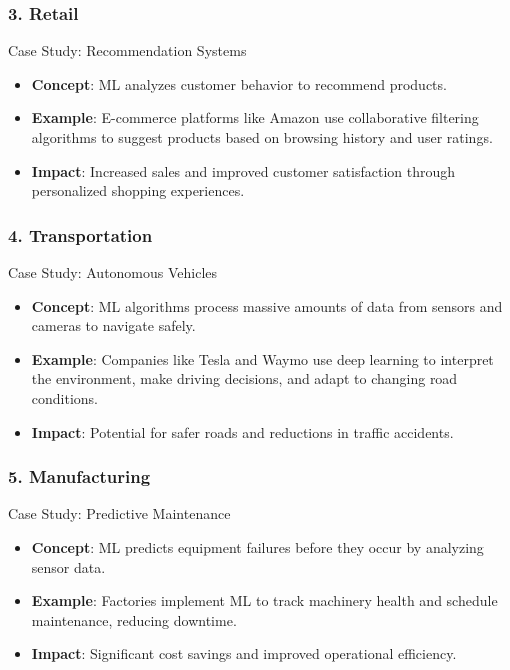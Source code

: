 \documentclass{beamer}
\begin{document}
\begin{frame}[fragile]
    \frametitle{3. Retail}
    \begin{block}{Case Study: Recommendation Systems}
        \begin{itemize}
            \item \textbf{Concept}: ML analyzes customer behavior to recommend products.
            \item \textbf{Example}: E-commerce platforms like Amazon use collaborative filtering algorithms to suggest products based on browsing history and user ratings.
            \item \textbf{Impact}: Increased sales and improved customer satisfaction through personalized shopping experiences.
        \end{itemize}
    \end{block}
\end{frame}

\begin{frame}[fragile]
    \frametitle{4. Transportation}
    \begin{block}{Case Study: Autonomous Vehicles}
        \begin{itemize}
            \item \textbf{Concept}: ML algorithms process massive amounts of data from sensors and cameras to navigate safely.
            \item \textbf{Example}: Companies like Tesla and Waymo use deep learning to interpret the environment, make driving decisions, and adapt to changing road conditions.
            \item \textbf{Impact}: Potential for safer roads and reductions in traffic accidents.
        \end{itemize}
    \end{block}
\end{frame}

\begin{frame}[fragile]
    \frametitle{5. Manufacturing}
    \begin{block}{Case Study: Predictive Maintenance}
        \begin{itemize}
            \item \textbf{Concept}: ML predicts equipment failures before they occur by analyzing sensor data.
            \item \textbf{Example}: Factories implement ML to track machinery health and schedule maintenance, reducing downtime.
            \item \textbf{Impact}: Significant cost savings and improved operational efficiency.
        \end{itemize}
    \end{block}
\end{frame}
\end{document}

